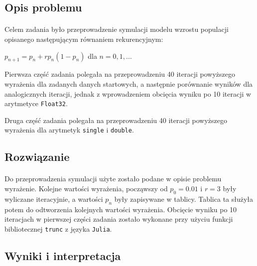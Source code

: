 \documentclass[a4paper]{article}
\begin{document}
\subsection{Opis problemu}
\paragraph{}
Celem zadania było przeprowadzenie symulacji modelu wzrostu populacji opisanego następującym równaniem rekurencyjnym:
\begin{center}
$p_{n + 1} = p_{n} + rp_{n}(1 - p_{n})$ dla $n = 0, 1, ...$
\end{center}

Pierwsza część zadania polegała na przeprowadzeniu 40 iteracji powyższego wyrażenia dla zadanych danych startowych, a następnie porównanie wyników dla analogicznych iteracji, jednak z wprowadzeniem obcięcia wyniku po 10 iteracji w arytmetyce \texttt{Float32}.

Druga część zadania polegała na przeprowadzeniu 40 iteracji powyższego wyrażenia dla arytmetyk \texttt{single} i \texttt{double}.
\subsection{Rozwiązanie}
\paragraph{}
Do przeprowadzenia symulacji użyte zostało podane w opisie problemu wyrażenie. Kolejne wartości wyrażenia, począwszy od $p_{0} = 0.01$ i $r = 3$ były wyliczane iteracyjnie, a wartości $p_{n}$ były zapisywane w tablicy. Tablica ta służyła potem do odtworzenia kolejnych wartości wyrażenia. Obcięcie wyniku po 10 iteracjach w pierwszej części zadania zostało wykonane przy użyciu funkcji bibliotecznej \texttt{trunc} z języka \texttt{Julia}.
\clearpage
\subsection{Wyniki i interpretacja}
\end{document}
